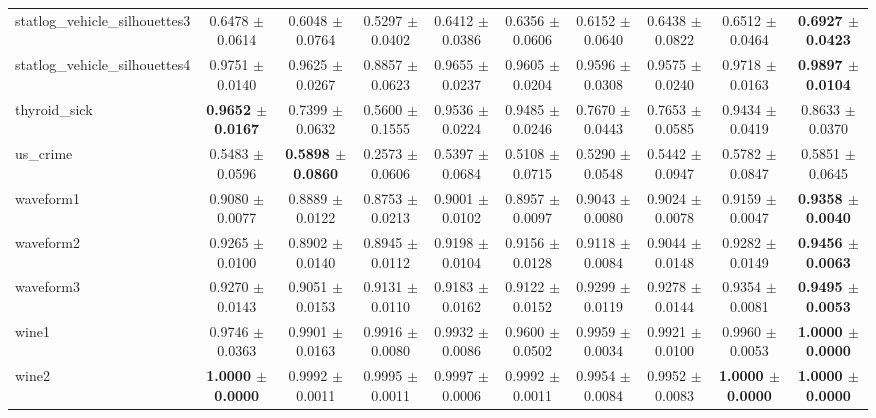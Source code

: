 \begin{table*}[htbp]
{\begin{tabular}{lccccccccc}
            statlog\_vehicle\_silhouettes3 & 0.6478 $\pm$ 0.0614 & 0.6048 $\pm$ 0.0764 & 0.5297 $\pm$ 0.0402 & 0.6412 $\pm$ 0.0386 & 0.6356 $\pm$ 0.0606 & 0.6152 $\pm$ 0.0640 & 0.6438 $\pm$ 0.0822 & 0.6512 $\pm$ 0.0464 & \cellcolor{graybg}\textbf{0.6927 $\pm$ 0.0423} \\ 
            statlog\_vehicle\_silhouettes4 & 0.9751 $\pm$ 0.0140 & 0.9625 $\pm$ 0.0267 & 0.8857 $\pm$ 0.0623 & 0.9655 $\pm$ 0.0237 & 0.9605 $\pm$ 0.0204 & 0.9596 $\pm$ 0.0308 & 0.9575 $\pm$ 0.0240 & 0.9718 $\pm$ 0.0163 & \cellcolor{graybg}\textbf{0.9897 $\pm$ 0.0104} \\ 
            thyroid\_sick & \cellcolor{graybg}\textbf{0.9652 $\pm$ 0.0167} & 0.7399 $\pm$ 0.0632 & 0.5600 $\pm$ 0.1555 & 0.9536 $\pm$ 0.0224 & 0.9485 $\pm$ 0.0246 & 0.7670 $\pm$ 0.0443 & 0.7653 $\pm$ 0.0585 & 0.9434 $\pm$ 0.0419 & 0.8633 $\pm$ 0.0370 \\ 
            us\_crime & 0.5483 $\pm$ 0.0596 & \cellcolor{graybg}\textbf{0.5898 $\pm$ 0.0860} & 0.2573 $\pm$ 0.0606 & 0.5397 $\pm$ 0.0684 & 0.5108 $\pm$ 0.0715 & 0.5290 $\pm$ 0.0548 & 0.5442 $\pm$ 0.0947 & 0.5782 $\pm$ 0.0847 & 0.5851 $\pm$ 0.0645 \\ 
            waveform1 & 0.9080 $\pm$ 0.0077 & 0.8889 $\pm$ 0.0122 & 0.8753 $\pm$ 0.0213 & 0.9001 $\pm$ 0.0102 & 0.8957 $\pm$ 0.0097 & 0.9043 $\pm$ 0.0080 & 0.9024 $\pm$ 0.0078 & 0.9159 $\pm$ 0.0047 & \cellcolor{graybg}\textbf{0.9358 $\pm$ 0.0040} \\ 
            waveform2 & 0.9265 $\pm$ 0.0100 & 0.8902 $\pm$ 0.0140 & 0.8945 $\pm$ 0.0112 & 0.9198 $\pm$ 0.0104 & 0.9156 $\pm$ 0.0128 & 0.9118 $\pm$ 0.0084 & 0.9044 $\pm$ 0.0148 & 0.9282 $\pm$ 0.0149 & \cellcolor{graybg}\textbf{0.9456 $\pm$ 0.0063} \\ 
            waveform3 & 0.9270 $\pm$ 0.0143 & 0.9051 $\pm$ 0.0153 & 0.9131 $\pm$ 0.0110 & 0.9183 $\pm$ 0.0162 & 0.9122 $\pm$ 0.0152 & 0.9299 $\pm$ 0.0119 & 0.9278 $\pm$ 0.0144 & 0.9354 $\pm$ 0.0081 & \cellcolor{graybg}\textbf{0.9495 $\pm$ 0.0053} \\ 
            wine1 & 0.9746 $\pm$ 0.0363 & 0.9901 $\pm$ 0.0163 & 0.9916 $\pm$ 0.0080 & 0.9932 $\pm$ 0.0086 & 0.9600 $\pm$ 0.0502 & 0.9959 $\pm$ 0.0034 & 0.9921 $\pm$ 0.0100 & 0.9960 $\pm$ 0.0053 & \cellcolor{graybg}\textbf{1.0000 $\pm$ 0.0000} \\ 
            wine2 & \cellcolor{graybg}\textbf{1.0000 $\pm$ 0.0000} & 0.9992 $\pm$ 0.0011 & 0.9995 $\pm$ 0.0011 & 0.9997 $\pm$ 0.0006 & 0.9992 $\pm$ 0.0011 & 0.9954 $\pm$ 0.0084 & 0.9952 $\pm$ 0.0083 & \cellcolor{graybg}\textbf{1.0000 $\pm$ 0.0000} & \cellcolor{graybg}\textbf{1.0000 $\pm$ 0.0000} \\ 

\end{tabular}}
\end{table*}
